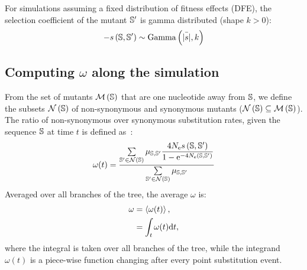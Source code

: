 For simulations assuming a fixed distribution of fitness effects (\acrshort{DFE}), the selection coefficient of the mutant $\mathbb{S}'$ is gamma distributed (shape $k > 0$):
\begin{equation}
    - s \left( \mathbb{S},\mathbb{S}'\right) \sim \text{Gamma} \left( \bar{|s|}, k \right)
\end{equation}

\subsection{Computing \texorpdfstring{$\omega$}{ω} along the simulation}
From the set of mutants $\mathcal{M}\left(\mathbb{S}\right)$ that are one nucleotide away from $\mathbb{S}$, we define the subsets $\mathcal{N}\left(\mathbb{S}\right)$ of \gls{non-synonymous} and \gls{synonymous} mutants ($\mathcal{N}\left(\mathbb{S}\right) \subseteq \mathcal{M}\left(\mathbb{S}\right)$).
The ratio of \gls{non-synonymous} over \gls{synonymous} \gls{substitution} rates, given the sequence $\mathbb{S}$ at time $t$ is defined as~\citep{Spielman2015, DosReis2015, Jones2016}:
\begin{equation}
    \omega(t) = \dfrac{\sum\limits_{\mathbb{S}' \in \mathcal{N}\left(\mathbb{S}\right)} \mu_{\mathbb{S}, \mathbb{S}'} \dfrac{4 N_{\text{e}} s \left( \mathbb{S},\mathbb{S}'\right)}{{1 - \text{e}^{-4 N_{\text{e}} \left( \mathbb{S},\mathbb{S}'\right)} }}}{\sum\limits_{\mathbb{S}' \in \mathcal{N}\left(\mathbb{S}\right)} \mu_{\mathbb{S}, \mathbb{S}'}}
\end{equation}
Averaged over all branches of the tree, the average $\omega$ is:
\begin{align}
    \omega & = \left\langle \omega(t) \right\rangle, \\
    & = \int_{t} \omega (t) \text{d} t,
\end{align}
where the integral is taken over all branches of the tree, while the integrand $\omega (t)$ is a piece-wise function changing after every point \gls{substitution} event.
